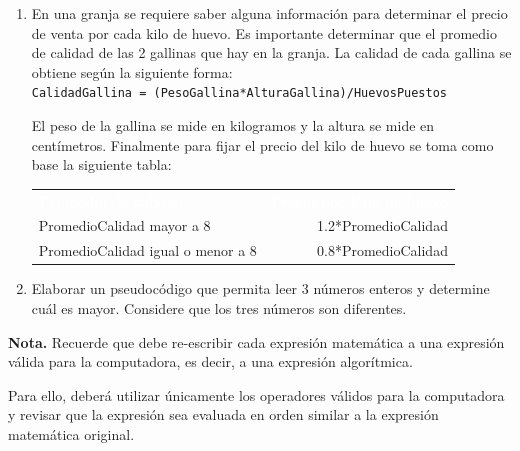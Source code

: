 \documentclass[spanish,11pt,twoside]{article}
\makeatletter
\DeclareRobustCommand\ttfamily
{\not@math@alphabet\ttfamily\mathtt
	\fontfamily\ttdefault\footnotesize\selectfont} %
\newcommand{\head}[1]{ %
	\textcolor{white}{\textbf{#1}}}
\renewcommand{\arraystretch}{1.5} %
\makeatother
\begin{document}
\begin{enumerate}
	\item En una granja se requiere saber alguna información para determinar el precio de venta 
	por cada kilo de huevo. Es importante determinar que el promedio de calidad de las 2 gallinas que hay en la granja. La calidad de cada gallina se obtiene según la siguiente forma:\\
	\texttt{CalidadGallina = (PesoGallina*AlturaGallina)/HuevosPuestos}


	El peso de la gallina se mide en kilogramos y la altura se mide en centímetros.
	Finalmente para fijar el precio del kilo de huevo se toma como base la siguiente tabla:

	

	\begin{table}[ht]
		\renewcommand{\arraystretch}{1.5} %
		\centering\footnotesize%
		\sffamily%
		
		\label{table:linux:distributions}
		\begin{tabular}{lr}
			\rowcolor{uasblue}%
			\head{Promedio de calidad} & \head{Precio por Kilo de huevo} \\
			PromedioCalidad mayor a 8 			& 1.2*PromedioCalidad \\
			PromedioCalidad igual o menor a 8 	& 0.8*PromedioCalidad \\
		\end{tabular}
	\end{table}
	
	
	\item Elaborar un pseudocódigo que permita leer 3 números enteros y determine cuál es mayor. Considere que los tres números son diferentes.
	
		
\end{enumerate}


\begin{noteblock} %
	\textcolor{uasblue}{\textbf{\textsf{Nota.}}} Recuerde que debe re-escribir cada expresión matemática a una expresión válida para la computadora, es decir, a una expresión algorítmica. 
	
	Para ello, deberá utilizar únicamente los operadores válidos para la computadora y revisar que la expresión sea evaluada en orden similar a la expresión matemática original.
\end{noteblock}
\end{document}

